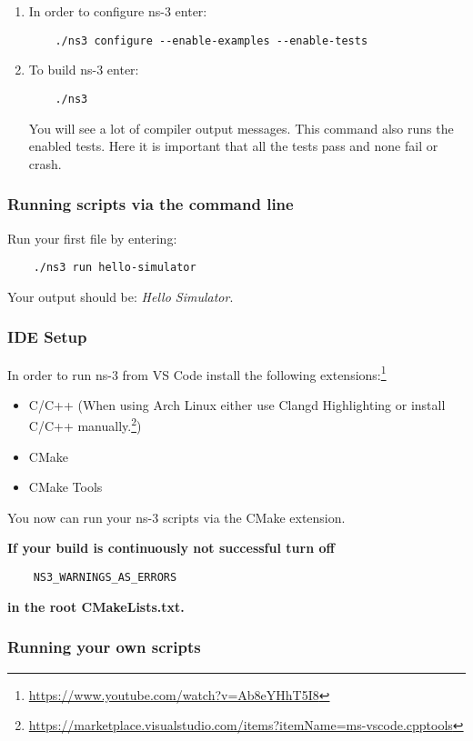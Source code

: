 \begin{enumerate}
    \item In order to configure ns-3 enter: \begin{verbatim}
    ./ns3 configure --enable-examples --enable-tests
\end{verbatim}
\item To build ns-3 enter: \begin{verbatim}
    ./ns3
\end{verbatim}
    You will see a lot of compiler output messages. This command also runs the enabled tests. Here it is important that all the tests pass and none fail or crash.
\end{enumerate}

\subsubsection{Running scripts via the command line}

Run your first file by entering: 
\begin{verbatim}
    ./ns3 run hello-simulator
\end{verbatim}
Your output should be: \textit{Hello Simulator}.

\subsubsection{IDE Setup}

In order to run ns-3 from VS Code install the following extensions:\footnote[3]{\url{https://www.youtube.com/watch?v=Ab8eYHhT5I8}}
\begin{itemize}
    \item C/C++ (When using Arch Linux either use Clangd Highlighting or install C/C++ manually.\footnote[4]{\url{https://marketplace.visualstudio.com/items?itemName=ms-vscode.cpptools}})
    \item CMake
    \item CMake Tools
\end{itemize}
You now can run your ns-3 scripts via the CMake extension.

\textbf{If your build is continuously not successful turn off} \begin{verbatim}
    NS3_WARNINGS_AS_ERRORS
\end{verbatim} \textbf{in the root CMakeLists.txt.}

\subsubsection{Running your own scripts}

